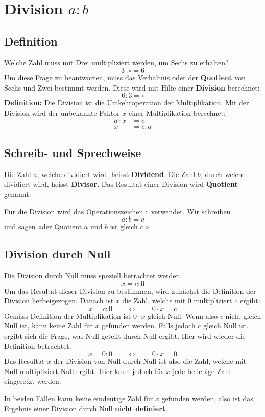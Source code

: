 \newpage
\section{Division $a:b$}

\subsection{Definition}

Welche Zahl muss mit Drei multipliziert werden, um Sechs zu erhalten?
\[
  3\cdot\square = 6
\]
Um diese Frage zu beantworten, muss das Verhältnis oder der \textbf{Quotient} von Sechs und Zwei bestimmt werden. Diese wird mit Hilfe einer \textbf{Division} berechnet:
\[
  6 : 3 = \square
\]
\textbf{Definition:} Die Division ist die Umkehroperation der Multiplikation. Mit der Division wird der unbekannte Faktor $x$ einer Multiplikation berechnet:
\begin{align*}
  a\cdot x &= c \\
         x &= c:a
\end{align*}

\subsection{Schreib- und Sprechweise}

Die Zahl $a$, welche dividiert wird, heisst \textbf{Dividend}. Die Zahl $b$, durch welche dividiert wird, heisst \textbf{Divisor}. Das Resultat einer Division wird \textbf{Quotient} genannt.

Für die Division wird das Operationszeichen $:$ verwendet. Wir schreiben
\[
  a : b = c
\]
und sagen «der Quotient $a$ und $b$ ist gleich $c$.»

\subsection{Division durch Null}

Die Division durch Null muss speziell betrachtet werden.
\[
  x = c:0
\]
Um das Resultat dieser Division zu bestimmen, wird zunächst die Definition der Division herbeigezogen. Danach ist $x$ die Zahl, welche mit $0$ multipliziert $c$ ergibt:
\[
  x = c:0 \qquad\Leftrightarrow\qquad 0\cdot x = c
\]
Gemäss Definition der Multiplikation ist $0\cdot x$ gleich Null. Wenn also $c$ nicht gleich Null ist, kann keine Zahl für $x$ gefunden werden. Falls jedoch $c$ gleich Null ist, ergibt sich die Frage, was Null geteilt durch Null ergibt. Hier wird wieder die Definition betrachtet:
\[
  x = 0:0 \qquad\Leftrightarrow\qquad 0\cdot x = 0
\]
Das Resultat $x$ der Division von Null durch Null ist also die Zahl, welche mit Null multipliziert Null ergibt. Hier kann jedoch für $x$ jede beliebige Zahl eingesetzt werden.

In beiden Fällen kann keine eindeutige Zahl für $x$ gefunden werden, also ist das Ergebnis einer Division durch Null \textbf{nicht definiert}.
